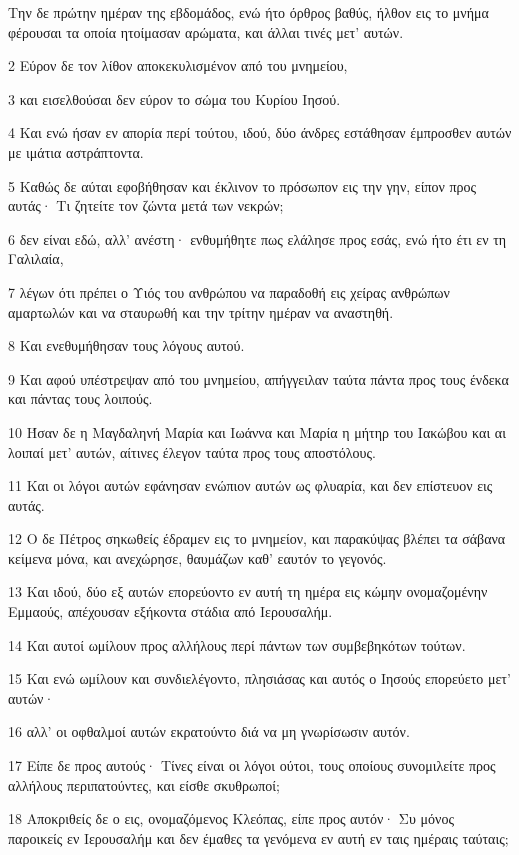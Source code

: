 \par Την δε πρώτην ημέραν της εβδομάδος, ενώ ήτο όρθρος βαθύς, ήλθον εις το μνήμα φέρουσαι τα οποία ητοίμασαν αρώματα, και άλλαι τινές μετ' αυτών.
\par 2 Εύρον δε τον λίθον αποκεκυλισμένον από του μνημείου,
\par 3 και εισελθούσαι δεν εύρον το σώμα του Κυρίου Ιησού.
\par 4 Και ενώ ήσαν εν απορία περί τούτου, ιδού, δύο άνδρες εστάθησαν έμπροσθεν αυτών με ιμάτια αστράπτοντα.
\par 5 Καθώς δε αύται εφοβήθησαν και έκλινον το πρόσωπον εις την γην, είπον προς αυτάς· Τι ζητείτε τον ζώντα μετά των νεκρών;
\par 6 δεν είναι εδώ, αλλ' ανέστη· ενθυμήθητε πως ελάλησε προς εσάς, ενώ ήτο έτι εν τη Γαλιλαία,
\par 7 λέγων ότι πρέπει ο Υιός του ανθρώπου να παραδοθή εις χείρας ανθρώπων αμαρτωλών και να σταυρωθή και την τρίτην ημέραν να αναστηθή.
\par 8 Και ενεθυμήθησαν τους λόγους αυτού.
\par 9 Και αφού υπέστρεψαν από του μνημείου, απήγγειλαν ταύτα πάντα προς τους ένδεκα και πάντας τους λοιπούς.
\par 10 Ήσαν δε η Μαγδαληνή Μαρία και Ιωάννα και Μαρία η μήτηρ του Ιακώβου και αι λοιπαί μετ' αυτών, αίτινες έλεγον ταύτα προς τους αποστόλους.
\par 11 Και οι λόγοι αυτών εφάνησαν ενώπιον αυτών ως φλυαρία, και δεν επίστευον εις αυτάς.
\par 12 Ο δε Πέτρος σηκωθείς έδραμεν εις το μνημείον, και παρακύψας βλέπει τα σάβανα κείμενα μόνα, και ανεχώρησε, θαυμάζων καθ' εαυτόν το γεγονός.
\par 13 Και ιδού, δύο εξ αυτών επορεύοντο εν αυτή τη ημέρα εις κώμην ονομαζομένην Εμμαούς, απέχουσαν εξήκοντα στάδια από Ιερουσαλήμ.
\par 14 Και αυτοί ωμίλουν προς αλλήλους περί πάντων των συμβεβηκότων τούτων.
\par 15 Και ενώ ωμίλουν και συνδιελέγοντο, πλησιάσας και αυτός ο Ιησούς επορεύετο μετ' αυτών·
\par 16 αλλ' οι οφθαλμοί αυτών εκρατούντο διά να μη γνωρίσωσιν αυτόν.
\par 17 Είπε δε προς αυτούς· Τίνες είναι οι λόγοι ούτοι, τους οποίους συνομιλείτε προς αλλήλους περιπατούντες, και είσθε σκυθρωποί;
\par 18 Αποκριθείς δε ο εις, ονομαζόμενος Κλεόπας, είπε προς αυτόν· Συ μόνος παροικείς εν Ιερουσαλήμ και δεν έμαθες τα γενόμενα εν αυτή εν ταις ημέραις ταύταις;
